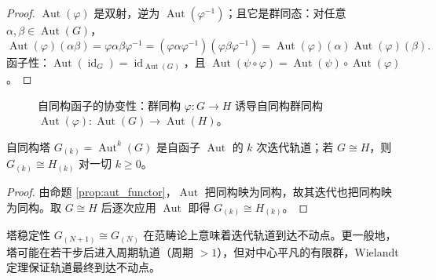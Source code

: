 \begin{proof}
$\operatorname{Aut}(\varphi)$ 是双射，逆为 $\operatorname{Aut}(\varphi^{-1})$；且它是群同态：对任意 $\alpha,\beta\in\operatorname{Aut}(G)$，
\[
\operatorname{Aut}(\varphi)(\alpha\beta) = \varphi\alpha\beta\varphi^{-1} = (\varphi\alpha\varphi^{-1})(\varphi\beta\varphi^{-1}) = \operatorname{Aut}(\varphi)(\alpha)\operatorname{Aut}(\varphi)(\beta).
\]
函子性：$\operatorname{Aut}(\operatorname{id}_G)=\operatorname{id}_{\operatorname{Aut}(G)}$，且 $\operatorname{Aut}(\psi\circ\varphi)=\operatorname{Aut}(\psi)\circ\operatorname{Aut}(\varphi)$。
\end{proof}

\begin{figure}[htbp]
\centering
{}
\caption{自同构函子的协变性：群同构 $\varphi: G\to H$ 诱导自同构群同构 $\operatorname{Aut}(\varphi): \operatorname{Aut}(G)\to\operatorname{Aut}(H)$。}
\label{fig:aut_functor}
\end{figure}

\begin{corollary}[塔的函子性]\label{cor:tower_functor}
自同构塔 $G_{(k)}=\operatorname{Aut}^k(G)$ 是自函子 $\operatorname{Aut}$ 的 $k$ 次迭代轨道；若 $G\cong H$，则 $G_{(k)}\cong H_{(k)}$ 对一切 $k\ge 0$。
\end{corollary}

\begin{proof}
由命题 \ref{prop:aut_functor}，$\operatorname{Aut}$ 把同构映为同构，故其迭代也把同构映为同构。取 $G\cong H$ 后逐次应用 $\operatorname{Aut}$ 即得 $G_{(k)}\cong H_{(k)}$。
\end{proof}

\begin{remark}[塔稳定性与迭代不动点]\label{rem:tower_fixed_point}
塔稳定性 $G_{(N+1)}\cong G_{(N)}$ 在范畴论上意味着迭代轨道到达不动点。更一般地，塔可能在若干步后进入周期轨道（周期 $>1$），但对中心平凡的有限群，Wielandt 定理保证轨道最终到达不动点。
\end{remark}

